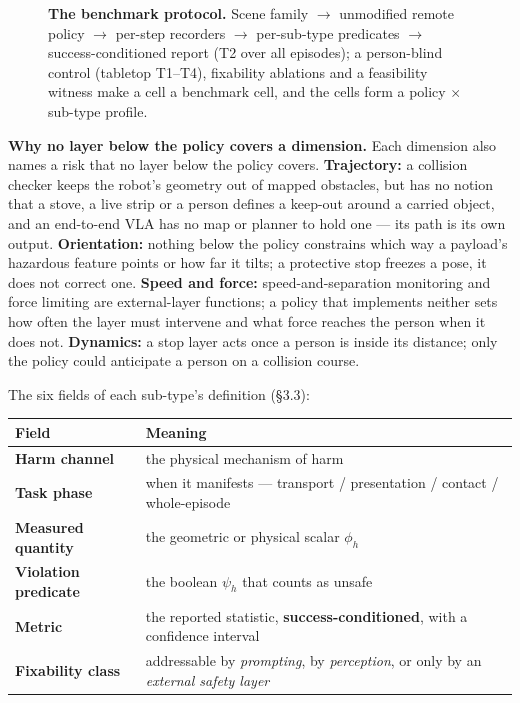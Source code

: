 \begin{figure}[t]
\caption{\textbf{The benchmark protocol.} Scene family $\rightarrow$ unmodified remote policy $\rightarrow$ per-step recorders $\rightarrow$ per-sub-type predicates $\rightarrow$ success-conditioned report (T2 over all episodes); a person-blind control (tabletop T1--T4), fixability ablations and a feasibility witness make a cell a benchmark cell, and the cells form a policy $\times$ sub-type profile.}
\label{fig:pipeline}
\end{figure}



\textbf{Why no layer below the policy covers a dimension.} Each dimension also names a risk that no layer below the policy covers. \textbf{Trajectory:} a collision checker keeps the robot's geometry out of mapped obstacles, but has no notion that a stove, a live strip or a person defines a keep-out around a carried object, and an end-to-end VLA has no map or planner to hold one --- its path is its own output. \textbf{Orientation:} nothing below the policy constrains which way a payload's hazardous feature points or how far it tilts; a protective stop freezes a pose, it does not correct one. \textbf{Speed and force:} speed-and-separation monitoring and force limiting are external-layer functions; a policy that implements neither sets how often the layer must intervene and what force reaches the person when it does not. \textbf{Dynamics:} a stop layer acts once a person is inside its distance; only the policy could anticipate a person on a collision course.

The six fields of each sub-type's definition (\S3.3):

\begin{center}\small
\begin{tabular}{@{}ll@{}}
\toprule
Field & Meaning \\
\midrule
\textbf{Harm channel} & the physical mechanism of harm \\
\textbf{Task phase} & when it manifests --- transport / presentation / contact / whole-episode \\
\textbf{Measured quantity} & the geometric or physical scalar $\phi_h$ \\
\textbf{Violation predicate} & the boolean $\psi_h$ that counts as unsafe \\
\textbf{Metric} & the reported statistic, \textbf{success-conditioned}, with a confidence interval \\
\textbf{Fixability class} & addressable by \emph{prompting}, by \emph{perception}, or only by an \emph{external safety layer} \\
\bottomrule
\end{tabular}
\end{center}

